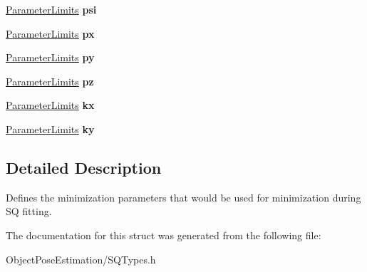 \begin{DoxyCompactItemize}
\item 
\hypertarget{structope_1_1_minimization_parameters_a9d9152c198c487a4ac006bc5f40e1aa9}{\hyperlink{structope_1_1_parameter_limits}{Parameter\-Limits} {\bfseries psi}}\label{structope_1_1_minimization_parameters_a9d9152c198c487a4ac006bc5f40e1aa9}

\item 
\hypertarget{structope_1_1_minimization_parameters_a6805d0277cf33546df748c2ae3cf45d6}{\hyperlink{structope_1_1_parameter_limits}{Parameter\-Limits} {\bfseries px}}\label{structope_1_1_minimization_parameters_a6805d0277cf33546df748c2ae3cf45d6}

\item 
\hypertarget{structope_1_1_minimization_parameters_a68f6cc1d4230a5d5b03cafadd74be00e}{\hyperlink{structope_1_1_parameter_limits}{Parameter\-Limits} {\bfseries py}}\label{structope_1_1_minimization_parameters_a68f6cc1d4230a5d5b03cafadd74be00e}

\item 
\hypertarget{structope_1_1_minimization_parameters_aabf01d0d6907a434ca2067aa37b27547}{\hyperlink{structope_1_1_parameter_limits}{Parameter\-Limits} {\bfseries pz}}\label{structope_1_1_minimization_parameters_aabf01d0d6907a434ca2067aa37b27547}

\item 
\hypertarget{structope_1_1_minimization_parameters_a159f298b6e9ef83547b85abfdb371eaa}{\hyperlink{structope_1_1_parameter_limits}{Parameter\-Limits} {\bfseries kx}}\label{structope_1_1_minimization_parameters_a159f298b6e9ef83547b85abfdb371eaa}

\item 
\hypertarget{structope_1_1_minimization_parameters_a34c3107057524995cd4f520055c3bc81}{\hyperlink{structope_1_1_parameter_limits}{Parameter\-Limits} {\bfseries ky}}\label{structope_1_1_minimization_parameters_a34c3107057524995cd4f520055c3bc81}

\end{DoxyCompactItemize}


\subsection{Detailed Description}
Defines the minimization parameters that would be used for minimization during S\-Q fitting. 

The documentation for this struct was generated from the following file\-:\begin{DoxyCompactItemize}
\item 
Object\-Pose\-Estimation/S\-Q\-Types.\-h\end{DoxyCompactItemize}
